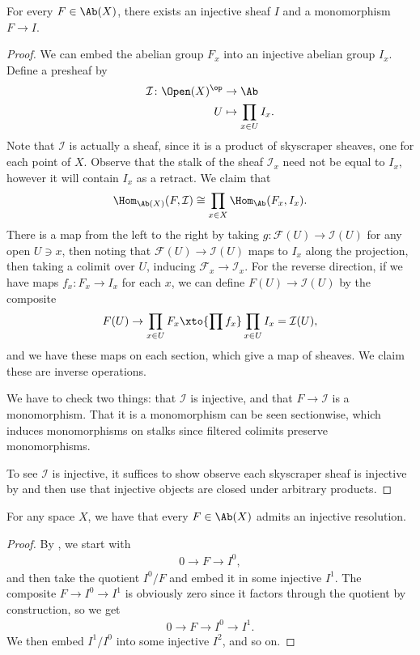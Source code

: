 \documentclass[11pt]{amsart}
\begin{document}
\begin{proposition}\label{prop:abX-enough-injectives} 
For every $F \in \Ab(X)$, there exists an injective sheaf $I$ and a monomorphism $F \to I$.
\end{proposition}
\begin{proof} We can embed the abelian group $F_x$ into an injective abelian group $I_x$. Define a presheaf by
\begin{align*}
    \mathcal{I} \colon \Open(X)^\op &\to \Ab \\
    U &\mapsto \prod_{x\in U}I_x.
\end{align*}
Note that $\mathcal{I}$ is actually a sheaf, since it is a product of skyscraper sheaves, one for each point of $X$. Observe that the stalk of the sheaf $\mathcal{I}_x$ need not be equal to $I_x$, however it will contain $I_x$ as a retract. We claim that
\begin{align*}
    \Hom_{\Ab(X)}(F,\mathcal{I}) \cong \prod_{x\in X}\Hom_\Ab(F_x,I_x).
\end{align*}
There is a map from the left to the right by taking $g \colon \mathcal{F}(U) \to \mathcal{I}(U)$ for any open $U\ni x$, then noting that $\mathcal{F}(U) \to \mathcal{I}(U)$ maps to $I_x$ along the projection, then taking a colimit over $U$, inducing $\mathcal{F}_x \to \mathcal{I}_x$. For the reverse direction, if we have maps $f_x \colon F_x \to I_x$ for each $x$, we can define $F(U) \to \mathcal{I}(U)$ by the composite
\begin{align*}
    F(U) \to \prod_{x\in U} F_x \xto{\prod f_x} \prod_{x\in U} I_x = \mathcal{I}(U),
\end{align*}
and we have these maps on each section, which give a map of sheaves. We claim these are inverse operations.

We have to check two things: that $\mathcal{I}$ is injective, and that $F \to \mathcal{I}$ is a monomorphism. That it is a monomorphism can be seen sectionwise, which induces monomorphisms on stalks since filtered colimits preserve monomorphisms.

To see $\mathcal{I}$ is injective, it suffices to show observe each skyscraper sheaf is injective by  and then use that injective objects are closed under arbitrary products.
\end{proof}

\begin{corollary} For any space $X$, we have that every $F\in\Ab(X)$ admits an injective resolution.
\end{corollary}
\begin{proof} By , we start with
\begin{align*}
    0 \to F \to I^0,
\end{align*}
and then take the quotient $I^0/F$ and embed it in some injective $I^1$. The composite $F \to I^0 \to I^1$ is obviously zero since it factors through the quotient by construction, so we get
\begin{align*}
    0 \to F \to I^0 \to I^1.
\end{align*}
We then embed $I^1/I^0$ into some injective $I^2$, and so on.
\end{proof}
\end{document}
